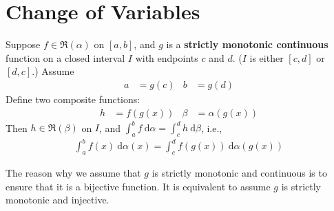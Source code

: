 \documentclass[thmcnt=section, 12pt]{elegantbook}
\begin{document}

\section{Change of Variables}


\begin{theorem}
    Suppose $f \in \mathfrak{R}(\alpha)$ on $[a, b]$, and $g$ is a \textbf{strictly monotonic continuous} function on a closed interval $I$ with endpoints $c$ and $d$. ($I$ is either $[c, d]$ or $[d, c]$.) Assume
    \begin{align*}
        a &= g(c) & b &= g(d)
    \end{align*}
    Define two composite functions:
    \begin{align*}
        h &= f(g(x)) & 
        \beta &= \alpha(g(x))
    \end{align*}
    Then $h \in \mathfrak{R}(\beta)$ on $I$, and $\int_a^b f \ \mathrm{d}\alpha = \int_c^d h \ \mathrm{d}\beta$, i.e., 
    \begin{align*}
        \int_a^b f(x) \ \mathrm{d}\alpha(x) = \int_c^d f(g(x)) \ \mathrm{d}\alpha(g(x))
    \end{align*}
\end{theorem}

\begin{remark}
    The reason why we assume that $g$ is strictly monotonic and continuous is to ensure that it is a bijective function. It is equivalent to assume $g$ is strictly monotonic and injective.
\end{remark}
\end{document}
